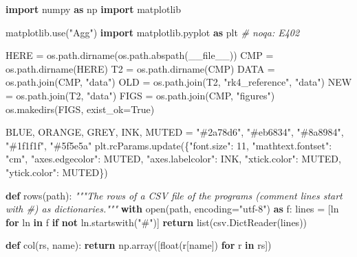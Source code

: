 \documentclass[
  10pt,
]{article}
\newenvironment{Shaded}{}{}
\newcommand{\BuiltInTok}[1]{\textcolor[rgb]{0.00,0.50,0.00}{#1}}
\newcommand{\CommentTok}[1]{\textcolor[rgb]{0.38,0.63,0.69}{\textit{#1}}}
\newcommand{\ControlFlowTok}[1]{\textcolor[rgb]{0.00,0.44,0.13}{\textbf{#1}}}
\newcommand{\DecValTok}[1]{\textcolor[rgb]{0.25,0.63,0.44}{#1}}
\newcommand{\ImportTok}[1]{\textcolor[rgb]{0.00,0.50,0.00}{\textbf{#1}}}
\newcommand{\KeywordTok}[1]{\textcolor[rgb]{0.00,0.44,0.13}{\textbf{#1}}}
\newcommand{\NormalTok}[1]{#1}
\newcommand{\OperatorTok}[1]{\textcolor[rgb]{0.40,0.40,0.40}{#1}}
\newcommand{\StringTok}[1]{\textcolor[rgb]{0.25,0.44,0.63}{#1}}
\newcommand{\VariableTok}[1]{\textcolor[rgb]{0.10,0.09,0.49}{#1}}
\begin{document}
\begin{Shaded}
\begin{Highlighting}[]
\ImportTok{import}\NormalTok{ numpy }\ImportTok{as}\NormalTok{ np}
\ImportTok{import}\NormalTok{ matplotlib}

\NormalTok{matplotlib.use(}\StringTok{"Agg"}\NormalTok{)}
\ImportTok{import}\NormalTok{ matplotlib.pyplot }\ImportTok{as}\NormalTok{ plt  }\CommentTok{\# noqa: E402}

\NormalTok{HERE }\OperatorTok{=}\NormalTok{ os.path.dirname(os.path.abspath(}\VariableTok{\_\_file\_\_}\NormalTok{))}
\NormalTok{CMP }\OperatorTok{=}\NormalTok{ os.path.dirname(HERE)}
\NormalTok{T2 }\OperatorTok{=}\NormalTok{ os.path.dirname(CMP)}
\NormalTok{DATA }\OperatorTok{=}\NormalTok{ os.path.join(CMP, }\StringTok{"data"}\NormalTok{)}
\NormalTok{OLD }\OperatorTok{=}\NormalTok{ os.path.join(T2, }\StringTok{"rk4\_reference"}\NormalTok{, }\StringTok{"data"}\NormalTok{)}
\NormalTok{NEW }\OperatorTok{=}\NormalTok{ os.path.join(T2, }\StringTok{"data"}\NormalTok{)}
\NormalTok{FIGS }\OperatorTok{=}\NormalTok{ os.path.join(CMP, }\StringTok{"figures"}\NormalTok{)}
\NormalTok{os.makedirs(FIGS, exist\_ok}\OperatorTok{=}\VariableTok{True}\NormalTok{)}

\NormalTok{BLUE, ORANGE, GREY, INK, MUTED }\OperatorTok{=} \StringTok{"\#2a78d6"}\NormalTok{, }\StringTok{"\#eb6834"}\NormalTok{, }\StringTok{"\#8a8984"}\NormalTok{, }\StringTok{"\#1f1f1f"}\NormalTok{, }\StringTok{"\#5f5e5a"}
\NormalTok{plt.rcParams.update(\{}\StringTok{"font.size"}\NormalTok{: }\DecValTok{11}\NormalTok{, }\StringTok{"mathtext.fontset"}\NormalTok{: }\StringTok{"cm"}\NormalTok{, }\StringTok{"axes.edgecolor"}\NormalTok{: MUTED,}
                     \StringTok{"axes.labelcolor"}\NormalTok{: INK, }\StringTok{"xtick.color"}\NormalTok{: MUTED, }\StringTok{"ytick.color"}\NormalTok{: MUTED\})}


\KeywordTok{def}\NormalTok{ rows(path):}
    \CommentTok{"""The rows of a CSV file of the programs (comment lines start with \textquotesingle{}\#\textquotesingle{}) as dictionaries."""}
    \ControlFlowTok{with} \BuiltInTok{open}\NormalTok{(path, encoding}\OperatorTok{=}\StringTok{"utf{-}8"}\NormalTok{) }\ImportTok{as}\NormalTok{ f:}
\NormalTok{        lines }\OperatorTok{=}\NormalTok{ [ln }\ControlFlowTok{for}\NormalTok{ ln }\KeywordTok{in}\NormalTok{ f }\ControlFlowTok{if} \KeywordTok{not}\NormalTok{ ln.startswith(}\StringTok{"\#"}\NormalTok{)]}
    \ControlFlowTok{return} \BuiltInTok{list}\NormalTok{(csv.DictReader(lines))}


\KeywordTok{def}\NormalTok{ col(rs, name):}
    \ControlFlowTok{return}\NormalTok{ np.array([}\BuiltInTok{float}\NormalTok{(r[name]) }\ControlFlowTok{for}\NormalTok{ r }\KeywordTok{in}\NormalTok{ rs])}



\end{Highlighting}
\end{Shaded}
\end{document}
